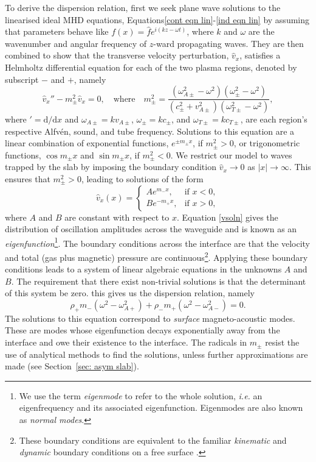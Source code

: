 To derive the dispersion relation, first we seek plane wave solutions to the linearised ideal MHD equations, Equations\eqref{cont eqn lin}-\eqref{ind eqn lin} by assuming that parameters behave like $f(x) = \hat{f}e^{i(kz - \omega t)}$, where $k$ and $\omega$ are the wavenumber and angular frequency of $z$-ward propagating waves. They are then combined to show that the transverse velocity perturbation, $\hat{v}_x$, satisfies a Helmholtz differential equation for each of the two plasma regions, denoted by subscript $-$ and $+$, namely
\begin{equation}
\hat{v}_x'' - m_\pm^2\hat{v}_x = 0, \quad \text{where} \quad
m_\pm^2 = \frac{(\omega_{A\pm}^2 - \omega^2)(\omega_\pm^2 - \omega^2)}{(c_\pm^2 + v_{A\pm}^2)(\omega_{T\pm}^2 - \omega^2)}, \label{ODE for v}
\end{equation}
where $'=\textrm{d}/\textrm{d}x$ and $\omega_{A\pm} = kv_{A\pm}$, $\omega_{\pm} = kc_{\pm}$, and $\omega_{T\pm} = kc_{T\pm}$, are each region's respective Alfv\'{e}n, sound, and tube frequency. Solutions to this equation are a linear combination of exponential functions, $e^{\pm m_\pm x}$, if $m_\pm^2 > 0$, or trigonometric functions, $\cos{m_\pm x}$ and $\sin{m_\pm x}$, if $m_\pm^2 < 0$. We restrict our model to waves trapped by the slab by imposing the boundary condition $\hat{v}_x \to 0$ as $|x| \to \infty$. This ensures that $m_\pm^2 > 0$, leading to solutions of the form
\begin{equation}
\hat{v}_x(x)=
\begin{cases}
Ae^{m_-x}, & \text{if } x < 0, \\
Be^{-m_+x}, & \text{if } x > 0,
\end{cases} \label{vsoln}
\end{equation}
where $A$ and $B$ are constant with respect to $x$. Equation \eqref{vsoln} gives the distribution of oscillation amplitudes across the waveguide and is known as an \textit{eigenfunction}\footnote{We use the term \textit{eigenmode} to refer to the whole solution, \textit{i.e.} an eigenfrequency and its associated eigenfunction. Eigenmodes are also known as \textit{normal modes}.}. The boundary conditions across the interface are that the velocity and total (gas plus magnetic) pressure are continuous\footnote{These boundary conditions are equivalent to the familiar \textit{kinematic} and \textit{dynamic} boundary conditions on a free surface \cite{goe_etal04}.}. Applying these boundary conditions leads to a system of linear algebraic equations in the unknowns $A$ and $B$. The requirement that there exist non-trivial solutions is that the determinant of this system be zero. this gives us the dispersion relation, namely
\begin{equation}
	\rho_+m_-(\omega^2 - \omega_{A+}^2) + \rho_-m_+(\omega^2 - \omega_{A-}^2) = 0. \label{DR interface}
\end{equation}
The solutions to this equation correspond to \textit{surface} magneto-acoustic modes. These are modes whose eigenfunction decays exponentially away from the interface and owe their existence to the interface. The radicals in $m_\pm$ resist the use of analytical methods to find the solutions, unless further approximations are made (see Section~\ref{sec: asym slab}).

